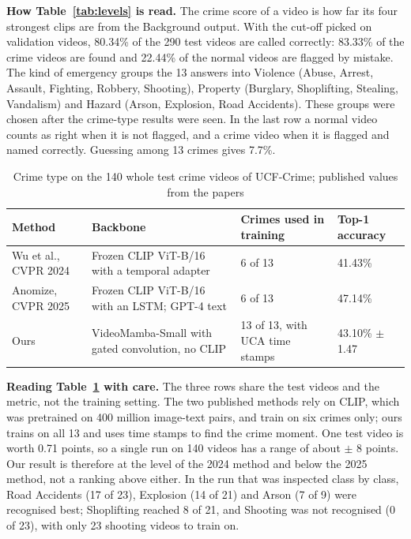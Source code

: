 \documentclass[11pt, a4paper]{article}
\begin{document}
\noindent
\textbf{How Table~\ref{tab:levels} is read.} The crime score of a video is how far its four strongest clips are from the Background output. With the cut-off picked on validation videos, 80.34\% of the 290 test videos are called correctly: 83.33\% of the crime videos are found and 22.44\% of the normal videos are flagged by mistake. The kind of emergency groups the 13 answers into Violence (Abuse, Arrest, Assault, Fighting, Robbery, Shooting), Property (Burglary, Shoplifting, Stealing, Vandalism) and Hazard (Arson, Explosion, Road Accidents). These groups were chosen after the crime-type results were seen. In the last row a normal video counts as right when it is not flagged, and a crime video when it is flagged and named correctly. Guessing among 13 crimes gives 7.7\%.

\begin{table}[H]
    \centering
    \footnotesize
    \renewcommand{\arraystretch}{1.25}
    \begin{tabular}{|p{3.6cm}|p{5.2cm}|p{3.4cm}|p{2.4cm}|}
        \hline
        \textbf{Method} & \textbf{Backbone} & \textbf{Crimes used in training} & \textbf{Top-1 accuracy} \\
        \hline
        Wu et al., CVPR 2024 \cite{wu2024ovvad} & Frozen CLIP ViT-B/16 with a temporal adapter & 6 of 13 & 41.43\% \\
        \hline
        Anomize, CVPR 2025 \cite{li2025anomize} & Frozen CLIP ViT-B/16 with an LSTM; GPT-4 text & 6 of 13 & 47.14\% \\
        \hline
        Ours & VideoMamba-Small with gated convolution, no CLIP & 13 of 13, with UCA time stamps & 43.10\% $\pm$ 1.47 \\
        \hline
    \end{tabular}
    \caption{Crime type on the 140 whole test crime videos of UCF-Crime; published values from the papers}
    \label{tab:papers}
\end{table}

\noindent
\textbf{Reading Table~\ref{tab:papers} with care.} The three rows share the test videos and the metric, not the training setting. The two published methods rely on CLIP, which was pretrained on 400 million image-text pairs, and train on six crimes only; ours trains on all 13 and uses time stamps to find the crime moment. One test video is worth 0.71 points, so a single run on 140 videos has a range of about $\pm$ 8 points. Our result is therefore at the level of the 2024 method and below the 2025 method, not a ranking above either. In the run that was inspected class by class, Road Accidents (17 of 23), Explosion (14 of 21) and Arson (7 of 9) were recognised best; Shoplifting reached 8 of 21, and Shooting was not recognised (0 of 23), with only 23 shooting videos to train on.
\end{document}
